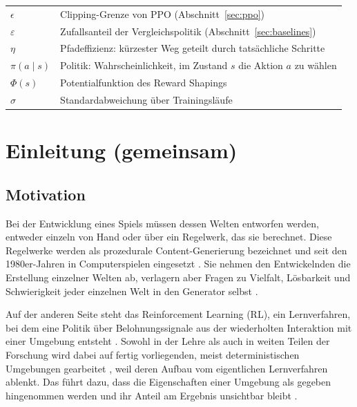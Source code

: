 \documentclass[11pt,a4paper]{article}
\let\sfOldSection\section
\renewcommand{\section}{\clearpage\sfOldSection}
\begin{document}
\begin{longtable}{@{}ll@{}}
$\epsilon$      & Clipping-Grenze von PPO (Abschnitt~\ref{sec:ppo}) \\
$\varepsilon$ & Zufallsanteil der Vergleichspolitik (Abschnitt~\ref{sec:baselines}) \\
$\eta$        & Pfadeffizienz: kürzester Weg geteilt durch tatsächliche Schritte \\
$\pi(a\mid s)$ & Politik: Wahrscheinlichkeit, im Zustand $s$ die Aktion $a$ zu wählen \\
$\Phi(s)$     & Potentialfunktion des Reward Shapings \\
$\sigma$      & Standardabweichung über Trainingsläufe \\
\bottomrule
\end{longtable}

\addtocounter{table}{-1}

\clearpage

\setcounter{page}{1}

\section{Einleitung (gemeinsam)}
\label{sec:einleitung}

\subsection{Motivation}

Bei der Entwicklung eines Spiels müssen dessen Welten entworfen werden,
entweder einzeln von Hand oder über ein Regelwerk, das sie berechnet. Diese
Regelwerke werden als prozedurale Content-Generierung bezeichnet und seit den
1980er-Jahren in Computerspielen eingesetzt \cite{shaker2016pcg}. Sie nehmen
den Entwickelnden die Erstellung
einzelner Welten ab, verlagern aber Fragen zu Vielfalt, Lösbarkeit und
Schwierigkeit jeder einzelnen Welt in den Generator selbst
\cite{togelius2011search}.

Auf der anderen Seite steht das Reinforcement Learning (RL), ein
Lernverfahren, bei dem eine Politik über Belohnungssignale aus der
wiederholten Interaktion mit einer Umgebung entsteht \cite{sutton2018rl}.
Sowohl in der Lehre als auch in weiten Teilen der Forschung wird dabei auf
fertig vorliegenden, meist deterministischen Umgebungen gearbeitet
\cite{kirk2023survey}, weil deren Aufbau vom eigentlichen Lernverfahren
ablenkt. Das führt dazu, dass die Eigenschaften einer Umgebung als gegeben
hingenommen werden und ihr Anteil am Ergebnis unsichtbar bleibt
\cite{risi2020increasing}.
\end{document}
